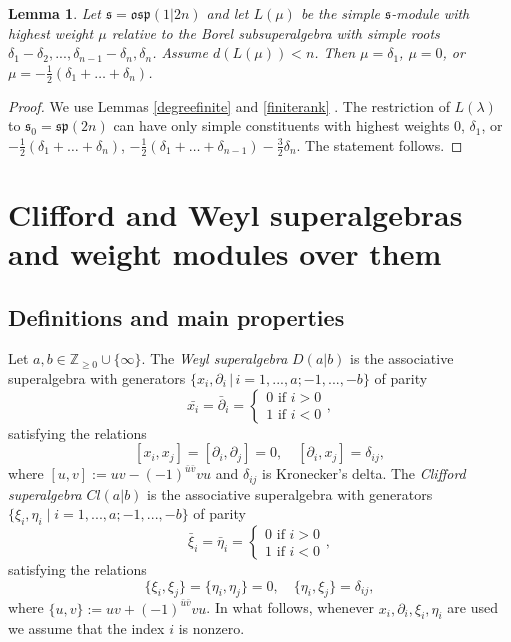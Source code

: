 \documentclass[12pt]{amsart}
\makeatletter
\def\@putname#1#2#3#4{\def\@@ref{#3}\let\old@bf\bf
        \def\bf##1{\old@bf\if?\noexpand##1?{#4}\else##1\fi}%
	#1{#2}%
        \let\bf\old@bf}
\def\@putname#1#2#3#4{\def\@@ref{#3}\let\old@bf\bf	%
	\let\old@reset@font\reset@font			%
        \def\bf##1{\old@bf\if?\noexpand##1?{#4}\else##1\fi}%
	\def\reset@font##1##2{\old@reset@font##1\if?\noexpand##2?{#4}\else##2\fi}#1{#2}%
        \let\bf\old@bf\let\reset@font\old@reset@font}
\let\my@ref=\ref
\def\ref#1{\@putname\my@ref{#1}{#1}{\tiny\rm\@@ref}}
\theoremstyle{plain} %
\numberwithin{equation}{section}
\theoremstyle{definition}
\theoremstyle{remark}
\theoremstyle{plain} %
\newtheorem{lemma}[definition]{Lemma}
\newcommand{\osp}{\mathfrak{osp}}
\newcommand{\Z}{\mathbb{Z}}
\newcommand{\gs}{\mathfrak{s}}
\def\gs{\mathfrak{s}}
\makeatother
\begin{document}
\begin{lemma}\label{osp12} Let $\gs=\osp(1|2n)$ and let $L(\mu)$ be the simple $\gs$-module with  highest weight $\mu$ relative to the Borel subsuperalgebra with simple roots $\delta_1 - \delta_2,...,\delta_{n-1} - \delta_n, \delta_n$. Assume
    $d(L(\mu))<n$. Then $\mu=\delta_1$, $\mu=0$, or $\mu=-\frac{1}{2}(\delta_1+\dots +\delta_n)$.
  \end{lemma}
  \begin{proof} We use Lemmas \ref{degreefinite} and \ref{finiterank}. The restriction of $L(\lambda)$ to $\gs_0=\mathfrak{sp}(2n)$ can have only simple constituents with highest weights $0$, $\delta_1$, or
    $-\frac{1}{2}(\delta_1+\dots+ \delta_n)$, $-\frac{1}{2}(\delta_1+\dots+\delta_{n-1})-\frac{3}{2}\delta_n$. The statement follows.
    \end{proof}



    
\section{Clifford and Weyl superalgebras and weight modules over them} \label{sec-clif-weyl}
\subsection{Definitions and main properties}
Let $a,b \in \Z_{\geq 0} \cup \{ \infty \}$. The \emph{Weyl superalgebra} $D(a|b)$ is the associative superalgebra with generators $\{x_i,\partial_i\, | \, i =1,...,a; -1,...,-b\}$ of  parity
$$\bar{x_i}=\bar{\partial}_i=\begin{cases} 0\,\,\text{if}\,\,i > 0\\ 1\,\,\text{if}\,\,i<0\end{cases},$$
satisfying the relations
$$[x_i,x_j]=[\partial_i,\partial_j]=0,\quad[\partial_i,x_j]=\delta_{ij},$$
where $[u,v]:=uv-(-1)^{\bar{u}\bar{v}}vu$ and  $\delta_{ij}$ is  Kronecker's delta.  The \emph{Clifford superalgebra} $Cl(a|b)$ is the associative superalgebra with generators $\{\xi_i,\eta_i\mid i =1,...,a; -1,...,-b \}$ of parity
$$\bar{\xi}_i=\bar{\eta}_i=\begin{cases} 0\,\,\text{if}\,\,i > 0\\ 1\,\,\text{if}\,\,i<0\end{cases},$$
satisfying the relations
$$\{\xi_i,\xi_j\}=\{\eta_i,\eta_j\}=0,\quad\{\eta_i,\xi_j\}=\delta_{ij},$$
where $\{u,v\}:=uv+(-1)^{\bar{u}\bar{v}}vu$. In what follows, whenever $x_i, \partial_i, \xi_i,\eta_i$ are used we assume that the index $i$ is nonzero. 
\end{document}
